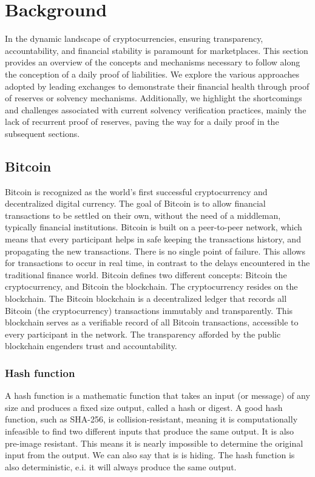 

\chapter{Background}


In the dynamic landscape of cryptocurrencies, ensuring transparency, accountability, and financial stability
is paramount for marketplaces. This section provides an overview of the concepts and mechanisms
necessary to follow along the conception of a daily proof of liabilities. We explore the various approaches adopted by leading exchanges
to demonstrate their financial health through proof of reserves or solvency mechanisms. Additionally, we
highlight the shortcomings and challenges associated with current solvency verification practices, mainly the lack of recurrent proof of reserves,
paving the way for a daily proof in the subsequent sections.




\section{Bitcoin}
Bitcoin is recognized as the world's first successful cryptocurrency and decentralized digital currency.
The goal of Bitcoin is to allow financial transactions to be settled on their own, without the need of a middleman, typically financial institutions.
Bitcoin is built on a peer-to-peer network, which means that every participant helps in safe keeping the transactions history, and propagating the new transactions.
There is no single point of failure. This allows for transactions to occur in real time, in contrast to the delays encountered in the traditional finance world.
Bitcoin defines two different concepts: Bitcoin the cryptocurrency, and Bitcoin the blockchain. The cryptocurrency resides on the blockchain.
The Bitcoin blockchain is a decentralized ledger that records all Bitcoin (the cryptocurrency) transactions immutably and transparently.
This blockchain serves as a verifiable record of all Bitcoin transactions, accessible to every participant in the network.
The transparency afforded by the public blockchain engenders trust and accountability. \cite{MB17}

\subsection{Hash function}
A hash function is a mathematic function that takes an input (or message) of any size and produces a fixed size output, called a hash or digest.
A good hash function, such as SHA-256, is collision-resistant, meaning it is computationally infeasible to find two different inputs that produce the same output. 
It is also pre-image resistant. This means it is nearly impossible to determine the original input from the output. We can also say that is is hiding.
The hash function is also deterministic, e.i. it will always produce the same output.


